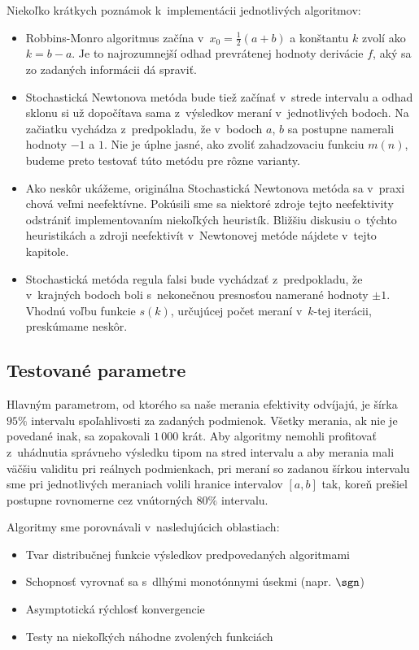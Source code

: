 Niekoľko krátkych poznámok k~implementácii jednotlivých algoritmov:
\begin{itemize}
\item Robbins-Monro algoritmus začína v~$x_0 = \tfrac{1}{2}(a+b)$ a konštantu
$k$ zvolí ako $k=b-a$. Je to najrozumnejší odhad prevrátenej hodnoty derivácie
$f$, aký sa zo zadaných informácii dá spraviť.

\item Stochastická Newtonova metóda bude tiež začínať v~strede intervalu a
odhad sklonu si už dopočítava sama z~výsledkov meraní v~jednotlivých bodoch. Na
začiatku vychádza z~predpokladu, že v~bodoch $a$, $b$ sa postupne namerali
hodnoty $-1$ a $1$. Nie je úplne jasné, ako zvoliť zahadzovaciu funkciu $m(n)$,
budeme preto testovať túto metódu pre rôzne varianty.

\item Ako neskôr ukážeme, originálna Stochastická Newtonova metóda sa v~praxi
chová veľmi neefektívne. Pokúsili sme sa niektoré zdroje tejto neefektivity
odstrániť implementovaním niekoľkých heuristík. Bližšiu diskusiu o~týchto
heuristikách a zdroji neefektivít v~Newtonovej metóde nájdete v~tejto kapitole.

\item Stochastická metóda regula falsi bude vychádzať z~predpokladu, že
v~krajných bodoch boli s~nekonečnou presnosťou namerané hodnoty $\pm 1$. Vhodnú
voľbu funkcie $s(k)$, určujúcej počet meraní v~$k$-tej iterácii, preskúmame
neskôr.
\end{itemize}


\subsection{Testované parametre}

Hlavným parametrom, od ktorého sa naše merania efektivity odvíjajú, je šírka
$95\unit{\%}$ intervalu spoľahlivosti za zadaných podmienok. Všetky merania, ak
nie je povedané inak, sa zopakovali $1\,000$ krát. Aby algoritmy
nemohli profitovať z~uhádnutia správneho výsledku tipom na stred
intervalu a aby merania mali väčšiu validitu pri reálnych podmienkach, pri
meraní so zadanou šírkou intervalu sme pri jednotlivých meraniach volili hranice
intervalov $[a,b]$ tak, koreň prešiel postupne rovnomerne cez vnútorných $80\%$
intervalu.

Algoritmy sme porovnávali v~nasledujúcich oblastiach:
\begin{itemize}
\item Tvar distribučnej funkcie výsledkov predpovedaných algoritmami
\item Schopnosť vyrovnať sa s~dlhými monotónnymi úsekmi (napr. $\sgn$)
\item Asymptotická rýchlosť konvergencie
\item Testy na niekoľkých náhodne zvolených funkciách
\end{itemize}

